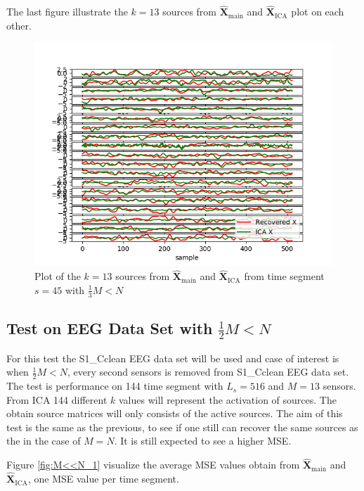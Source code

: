 The last figure illustrate the $k = 13$ sources from $\hat{\mathbf{X}}_{\text{main}}$ and $\hat{\mathbf{X}}_{\text{ICA}}$ plot on each other.
\begin{figure}[H]
    \centering
	\includegraphics[scale=0.5]{figures/ch_7/Sources_3M_N.png}
	\caption{Plot of the $k = 13$ sources from $\hat{\mathbf{X}}_{\text{main}}$ and $\hat{\mathbf{X}}_{\text{ICA}}$ from time segment $s = 45$ with $\frac{1}{3} M<N$}
	\label{fig:M<N_3}
\end{figure} 
\noindent

\subsection{Test on EEG Data Set with $\frac{1}{2} M<N$}
For this test the S1\_Cclean EEG data set will be used and case of interest is when $\frac{1}{2} M < N$, every second sensors is removed from S1\_Cclean EEG data set. The test is performance on 144 time segment with $L_s = 516$ and $M = 13$ sensors. From ICA 144 different $k$ values will represent the activation of sources. The obtain source matrices will only consists of the active sources.
The aim of this test is the same as the previous, to see if one still can recover the same sources as the in the case of $M=N$. It is still expected to see a higher MSE.

Figure \ref{fig:M<<N_1} visualize the average MSE values obtain from $\hat{\mathbf{X}}_{\text{main}}$ and $\hat{\mathbf{X}}_{\text{ICA}}$, one MSE value per time segment.

